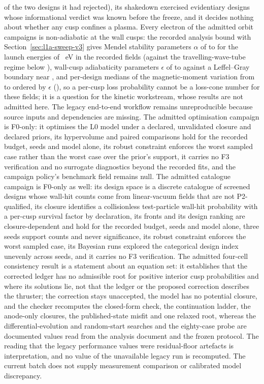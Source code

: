 \documentclass[11pt]{article}
\begin{document}
of the two designs it had rejected), its shakedown exercised evidentiary designs
whose informational verdict was known before the freeze, and it decides nothing
about whether any cusp confines a plasma. Every
electron of the admitted orbit campaigns is non-adiabatic at the wall cusps: the
recorded analysis bound with Section~\ref{sec:l1a-sweep-v3} gives Mendel
stability parameters $\alpha$ of \SwtPpmMendelAlphaMin{} to
\SwtPpmMendelAlphaMax{} for the launch energies of \SwtPpmEnergiesEv{}~eV in the
recorded fields (against the travelling-wave-tube regime below
\SwtPpmTwtAlphaLimit), wall-cusp adiabaticity parameters $\epsilon$ of
\SwtPpmEpsilonMin{} to \SwtPpmEpsilonMax{} against a Leffel--Gray boundary near
\SwtPpmLeffelGrayEpsilon, and per-design medians of the magnetic-moment
variation from \SwtPpmMuMedianMin{} to \SwtPpmMuMedianMax{} ordered by
$\epsilon$ (\SwtPpmMuOrderedByEpsilon), so a per-cusp loss probability cannot be
a loss-cone number for these fields; it is a question for the kinetic
workstream, whose results are not admitted here. The legacy end-to-end workflow remains
unreproducible because source inputs and dependencies are missing. The admitted
optimisation campaign is F0-only: it optimises the L0 model under a declared,
unvalidated closure and declared priors, its hypervolume and paired comparisons
hold for the recorded budget, seeds and model alone, its robust constraint
enforces the worst sampled case rather than the worst case over the prior's
support, it carries no F3 verification and no surrogate diagnostics beyond the
recorded fits, and the campaign policy's benchmark field remains null. The
admitted catalogue campaign is F0-only as well: its design space is a discrete
catalogue of screened designs whose wall-hit counts come from linear-vacuum
fields that are not P2-qualified, its closure identifies a collisionless
test-particle wall-hit probability with a per-cusp survival factor by
declaration, its fronts and its design ranking are closure-dependent and hold
for the recorded budget, seeds and model alone, three seeds support counts and
never significance, its robust constraint enforces the worst sampled case, its
Bayesian runs explored the categorical design index unevenly across seeds, and
it carries no F3 verification. The
admitted four-cell consistency result is a statement about an equation set: it
establishes that the corrected ledger has no admissible root for positive
interior cusp probabilities and where its solutions lie, not that the ledger or
the proposed correction describes the thruster; the correction stays
unaccepted, the model has no potential closure, and the checker recomputes the
closed-form check, the continuation ladder, the anode-only closures, the
published-state misfit and one relaxed root, whereas the differential-evolution
and random-start searches and the eighty-case probe are documented values read
from the analysis document and the frozen protocol. The reading that the legacy
performance values were residual-floor artefacts is interpretation, and no value
of the unavailable legacy run is recomputed. The
current batch does not supply measurement comparison or calibrated model
discrepancy.
\end{document}
